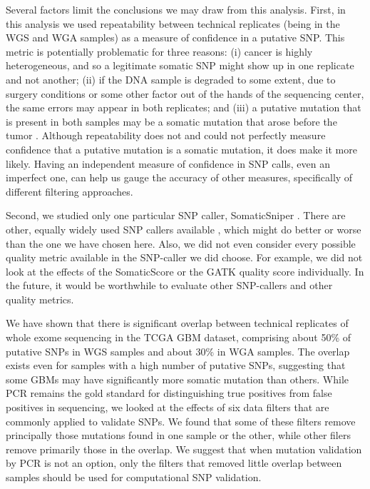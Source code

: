\documentclass[11pt]{article} %
\begin{document}
Several factors limit the conclusions we may draw from this analysis. First, in this analysis we used repeatability between technical replicates (being in the WGS and WGA samples) as a measure of confidence in a putative SNP. This metric is potentially problematic for three reasons: (i) cancer is highly heterogeneous, and so a legitimate somatic SNP might show up in one replicate and not another; (ii) if the DNA sample is degraded to some extent, due to surgery conditions or some other factor out of the hands of the sequencing center, the same errors may appear in both replicates; and (iii) a putative mutation that is present in both samples may be a somatic mutation that arose before the tumor \citep{pre-tumor-muts}. Although repeatability does not and could not perfectly measure confidence that a putative mutation is a somatic mutation, it does make it more likely. Having an independent measure of confidence in SNP calls, even an imperfect one, can help us gauge the accuracy of other measures, specifically of different filtering approaches. 

Second, we studied only one particular SNP caller, SomaticSniper \citep{SomaticSniper}. There are other, equally widely used SNP callers available \citep{MuTect, VarScan, Strelka}, which might do better or worse than the one we have chosen here. Also, we did not even consider every possible quality metric available in the SNP-caller we did choose. For example, we did not look at the effects of the SomaticScore or the GATK quality score individually. In the future, it would be worthwhile to evaluate other SNP-callers and other quality metrics.

We have shown that there is significant overlap between technical replicates of whole exome sequencing in the TCGA GBM dataset, comprising about 50\% of putative SNPs in WGS samples and about 30\% in WGA samples. The overlap exists even for samples with a high number of putative SNPs, suggesting that some GBMs may have significantly more somatic mutation than others. While PCR remains the gold standard for distinguishing true positives from false positives in sequencing, we looked at the effects of six data filters that are commonly applied to validate SNPs. We found that some of these filters remove principally those mutations found in one sample or the other, while other filers remove primarily those in the overlap. We suggest that when mutation validation by PCR is not an option, only the filters that removed little overlap between samples should be used for computational SNP validation.
\end{document}
